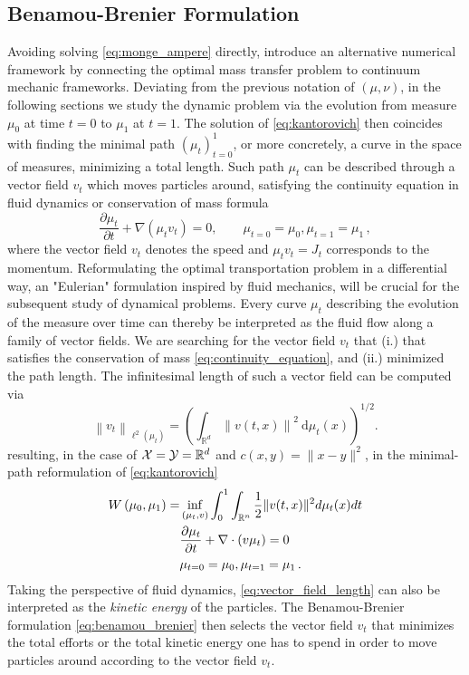 \subsection{Benamou-Brenier Formulation} \label{sec:background_benamou_brenier}

Avoiding solving \eqref{eq:monge_ampere} directly, \citet{benamou2000computational} introduce an alternative numerical framework by connecting the optimal mass transfer problem to continuum mechanic frameworks.
Deviating from the previous notation of $(\mu, \nu)$, in the following sections we study the dynamic problem via the evolution from measure $\mu_0$ at time $t=0$ to $\mu_1$ at $t=1$. The solution of \eqref{eq:kantorovich} then coincides with finding the minimal path $(\mu_t)_{t=0}^1$, or more concretely, a curve in the space of measures, minimizing a total length.  
Such path $\mu_t$ can be described through a vector field $v_t$ which moves particles around, satisfying the continuity equation in fluid dynamics or conservation of mass formula
\begin{equation} \label{eq:continuity_equation}
	\frac{\partial \mu_t}{\partial t}+\nabla\left(\mu_t v_t\right)= 0, \qquad \mu_{t=0}=\mu_0, \mu_{t=1}=\mu_1\,,
\end{equation}
where the vector field $v_t$ denotes the speed and $\mu_t v_t = J_t$ corresponds to the momentum.
Reformulating the optimal transportation problem in a differential way, an "Eulerian" formulation inspired by fluid mechanics, will be crucial for the subsequent study of dynamical problems.
Every curve $\mu_t$ describing the evolution of the measure over time can thereby be interpreted as the fluid flow along a family of vector fields. We are searching for the vector field $v_t$ that (i.) that satisfies the conservation of mass \eqref{eq:continuity_equation}, and (ii.) minimized the path length.
The infinitesimal length of such a vector field can be computed via 
\begin{equation} \label{eq:vector_field_length}
	\left\|v_t\right\|_{\ell^2\left(\mu_t\right)}=\left(\int_{\mathbb{R}^d}\left\|v(t, x)\right\|^2 \mathrm{~d} \mu_t(x)\right)^{1 / 2}.
\end{equation}
resulting, in the case of ${\mathcal{X}} = {\mathcal{Y}} = \mathbb{R}^d$ and $c(x, y)=\|x-y\|^2$, in the minimal-path reformulation of \eqref{eq:kantorovich}
\begin{align}  \label{eq:benamou_brenier}
	W\left(\mu_0, \mu_1\right)=& \inf _{(\mu_t, v)} \int_0^1 \int_{\mathbb{R}^n}\frac{1}{2}\lVert v(t, x)\rVert^2 d\mu_t(x) d t \\
	& \nonumber \frac{\partial \mu_t}{\partial t}+\nabla \cdot(v \mu_t)=0 \\
	& \nonumber \mu_{t=0}=\mu_0, \mu_{t=1}=\mu_1\, .
\end{align}
Taking the perspective of fluid dynamics, \eqref{eq:vector_field_length} can also be interpreted as the \emph{kinetic energy} of the particles. The Benamou-Brenier formulation \eqref{eq:benamou_brenier} then selects the vector field $v_t$ that minimizes the total efforts or the total kinetic energy one has to spend in order to move particles around according to the vector field $v_t$.

